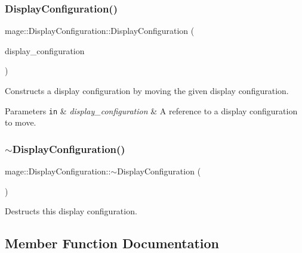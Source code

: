 \subsubsection{\texorpdfstring{Display\+Configuration()}{DisplayConfiguration()}\hspace{0.1cm}{\footnotesize\ttfamily [3/3]}}
{\footnotesize\ttfamily mage\+::\+Display\+Configuration\+::\+Display\+Configuration (\begin{DoxyParamCaption}\item[{\hyperlink{structmage_1_1_display_configuration}{Display\+Configuration} \&\&}]{display\+\_\+configuration }\end{DoxyParamCaption})\hspace{0.3cm}{\ttfamily [default]}}

Constructs a display configuration by moving the given display configuration.


\begin{DoxyParams}[1]{Parameters}
\mbox{\tt in}  & {\em display\+\_\+configuration} & A reference to a display configuration to move. \\
\hline
\end{DoxyParams}
\hypertarget{structmage_1_1_display_configuration_a91cdf4f2015177e41290238d96a55328}{}\label{structmage_1_1_display_configuration_a91cdf4f2015177e41290238d96a55328} 
\subsubsection{\texorpdfstring{$\sim$\+Display\+Configuration()}{~DisplayConfiguration()}}
{\footnotesize\ttfamily mage\+::\+Display\+Configuration\+::$\sim$\+Display\+Configuration (\begin{DoxyParamCaption}{ }\end{DoxyParamCaption})\hspace{0.3cm}{\ttfamily [default]}}

Destructs this display configuration. 

\subsection{Member Function Documentation}
\hypertarget{structmage_1_1_display_configuration_a415acc2cba9d5f28dc42073bb69fbac2}{}\label{structmage_1_1_display_configuration_a415acc2cba9d5f28dc42073bb69fbac2} 
